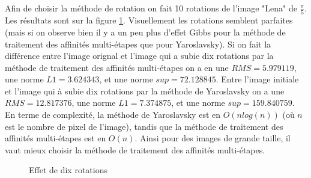 Afin de choisir la méthode de rotation on fait 10 rotations de l'image "Lena" de $\frac{\pi}{5}$. Les résultats sont sur la figure \ref{rotalena}. Visuellement les rotations semblent parfaites (mais si on observe bien il y a un peu plus d'effet Gibbs pour la méthode de traitement des affinités multi-étapes que pour Yaroslavsky). Si on fait la différence entre l'image orignal et l'image qui a subie dix rotations par la méthode de traitement des affinités multi-étapes on a en une $RMS=5.979119$, une norme $L1=3.624343$, et une norme $sup=72.128845$. Entre l'image initiale et l'image qui à subie dix rotations par la méthode de Yaroslavsky on a une $RMS=12.817376$, une norme $L1=7.374875$, et une norme $sup=159.840759$. \\

En terme de complexité, la méthode de Yaroslavsky est en $O(n log(n))$ (où $n$ est le nombre de pixel de l'image), tandis que la méthode de traitement des affinités multi-étapes est en $O(n)$. Ainsi pour des images de grande taille, il vaut mieux choisir la méthode de traitement des affinités multi-étapes.

 \begin{figure}
 
   \centering
   \caption{Effet de dix rotations}
\label{rotalena}
 \end{figure}
